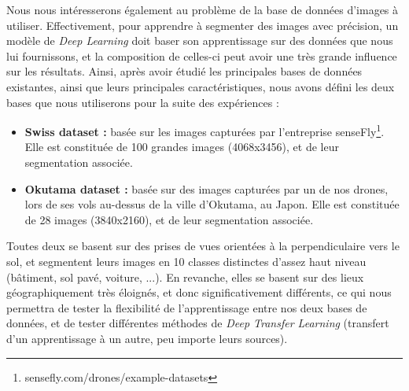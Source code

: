 Nous nous intéresserons également au problème de la base de données d'images à utiliser. Effectivement, pour apprendre à segmenter des images avec précision, un modèle de \textit{Deep Learning} doit baser son apprentissage sur des données que nous lui fournissons, et la composition de celles-ci peut avoir une très grande influence sur les résultats. Ainsi, après avoir étudié les principales bases de données existantes, ainsi que leurs principales caractéristiques, nous avons défini les deux bases que nous utiliserons pour la suite des expériences :
\begin{itemize}
\item \textbf{Swiss dataset :} basée sur les images capturées par l'entreprise senseFly\footnote{sensefly.com/drones/example-datasets}. Elle est constituée de 100 grandes images (4068x3456), et de leur segmentation associée.
\item \textbf{Okutama dataset :} basée sur des images capturées par un de nos drones, lors de ses vols au-dessus de la ville d'Okutama, au Japon. Elle est constituée de 28 images (3840x2160), et de leur segmentation associée.
\end{itemize}
Toutes deux se basent sur des prises de vues orientées à la perpendiculaire vers le sol, et segmentent leurs images en 10 classes distinctes d'assez haut niveau (bâtiment, sol pavé, voiture, ...). En revanche, elles se basent sur des lieux géographiquement très éloignés, et donc significativement différents, ce qui nous permettra de tester la flexibilité de l'apprentissage entre nos deux bases de données, et de tester différentes méthodes de \textit{Deep Transfer Learning} (transfert d'un apprentissage à un autre, peu importe leurs sources).

